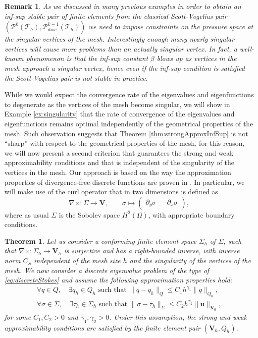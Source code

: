\documentclass[USenglish]{article}
\theoremstyle{dgthm}
\newtheorem{theorem}{Theorem}
\theoremstyle{dgdef}
\newtheorem{remark}{Remark}
\let\vec\bm
\newcommand\norm[1]{\lVert#1\rVert}
\begin{document}
\begin{remark}
  As we discussed in many previous examples in order to obtain an inf-sup stable pair of finite elements from the classical Scott-Vogelius pair $\left(\vec{\mathcal{P}}^k(\mathcal{T}_h),\mathcal{P}^{k-1}_{disc}(\mathcal{T}_h)\right)$ we need to impose constraints on the pressure space at the singular vertices of the mesh.
  Interestingly enough many nearly singular vertices will cause more problems than an actually singular vertex. 
  In fact, a well-known phenomenon is that the inf-sup constant $\beta$ blows up as vertices in the mesh approach a singular vertex, hence even if the inf-sup condition is satisfied the Scott-Vogelius pair is not stable in practice.
\end{remark}
While we would expect the convergence rate of the eigenvalues and eigenfunctions to degenerate as the vertices of the mesh become singular, we will show in Example \ref{ex:singularity} that the rate of convergence of the eigenvalues and eigenfunctions remains optimal independently of the geometrical properties of the mesh.
Such observation suggests that Theorem \ref{thm:strongApproxInfSup} is not ``sharp'' with respect to the geometrical properties of the mesh, for this reason, we will now present a second criterion that guarantees the strong and weak approximability conditions and that is independent of the singularity of the vertices in the mesh.
Our approach is based on the way the approximation properties of divergence-free discrete functions are proven in \cite{AinsworthParker}.
In particular, we will make use of the curl operator that in two dimensions is defined as
\begin{equation}
  \nabla \times: \Sigma \to \vec{V} , \qquad \sigma\mapsto \begin{pmatrix} \partial_y \sigma & - \partial_x \sigma \end{pmatrix},
\end{equation}
where as usual $\Sigma$ is the Sobolev space $H^2(\Omega)$, with appropriate boundary conditions.
\begin{theorem}
\label{thm:strongApproxCurl}
Let us consider a conforming finite element space $\Sigma_h$ of $\Sigma$, such that $\nabla\times:\Sigma_h\to \vec{V}_h$ is surjective and has a right-bounded inverse, with inverse norm $C_S$ independent of the mesh size $h$ and the singularity of the vertices of the mesh.
We now consider a discrete eigenvalue problem of the type of \eqref{eq:discreteStokes} and assume the following approximation properties hold:
\begin{align}
  \forall q\in Q, \quad \exists q_h\in Q_h \text{ such that } \norm{q-q_h}_{Q}\leq C_1 h^{\gamma_1}\norm{q}_{Q_0},\\
  \forall \sigma\in \Sigma, \quad \exists \tau_h\in \Sigma_h \text{ such that } \norm{\sigma-\tau_h}_{\Sigma}\leq C_2 h^{\gamma_2}\norm{\vec{u}}_{\vec{V}_0},\label{eq:approxSigma}
\end{align}
for some $C_1,C_2>0$ and $\gamma_1,\gamma_2>0$.
Under this assumption, the strong and weak approximability conditions are satisfied by the finite element pair $(\vec{V}_h,Q_h)$.
\end{theorem}
\end{document}
